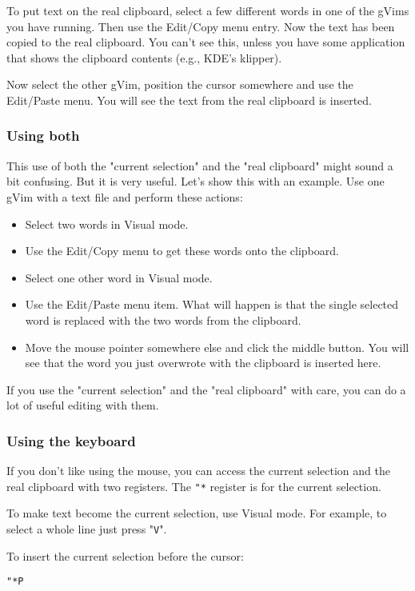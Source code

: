 To put text on the real clipboard, select a few different words in one of the gVims you have running.
Then use the Edit/Copy menu entry.
Now the text has been copied to the real clipboard.
You can't see this, unless you have some application that shows the clipboard contents (e.g., KDE's klipper).

Now select the other gVim, position the cursor somewhere and use the Edit/Paste menu.
You will see the text from the real clipboard is inserted.
\subsubsection{Using both}
This use of both the "current selection" and the "real clipboard" might sound a bit confusing.
But it is very useful.
Let's show this with an example.
Use one gVim with a text file and perform these actions:

\begin{itemize}
				\item Select two words in Visual mode.
				\item Use the Edit/Copy menu to get these words onto the clipboard.
				\item Select one other word in Visual mode.
				\item Use the Edit/Paste menu item.
								What will happen is that the single selected word is replaced with the two words from the clipboard.
				\item Move the mouse pointer somewhere else and click the middle button.
								You will see that the word you just overwrote with the clipboard is inserted here.
\end{itemize}

If you use the "current selection" and the "real clipboard" with care, you can do a lot of useful editing with them.
\subsubsection{Using the keyboard}

If you don't like using the mouse, you can access the current selection and the real clipboard with two registers.
The \verb!"*! register is for the current selection.

To make text become the current selection, use Visual mode.
For example, to select a whole line just press "\verb!V!".

To insert the current selection before the cursor:

 \begin{Verbatim}[samepage=true]
 "*P
 \end{Verbatim}

